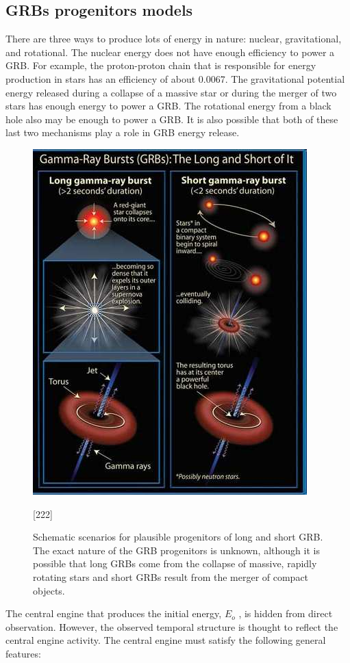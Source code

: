 \subsection{ GRBs progenitors models }
There are three ways to produce lots of energy in nature: nuclear, gravitational, and
rotational. The nuclear energy does not have enough efficiency to power a GRB. For
example, the proton-proton chain that is responsible for energy production in stars has an efficiency of about 0.0067. The gravitational potential energy released during a collapse of a massive star or during the merger of two stars has enough energy to power a GRB. The rotational energy from a black hole also may be enough to power a GRB. It is also possible that both of these last two mechanisms play a role in GRB energy release.
\begin{figure}[h]
\begin{center}
\includegraphics[scale=0.4]{Figures/prog of GRBs.png}
\caption{Schematic scenarios for plausible progenitors of long and short GRB. The exact nature of the GRB progenitors is unknown, although it is possible that long GRBs come from the collapse of massive, rapidly rotating stars and short GRBs result from the merger of compact objects.}[222]
\end{center}
\end{figure}
The central engine that produces the initial energy, $ E_{o} $ , is hidden from direct observation. However, the observed temporal structure is thought to reflect the central engine activity. The central engine must satisfy the following general features:\\
